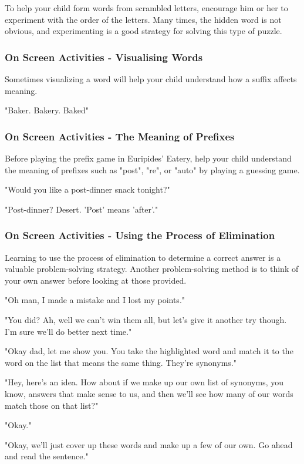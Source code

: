 To help your child form words from scrambled letters, encourage him or her to experiment with the order of the letters.
Many times, the hidden word is not obvious, and experimenting is a good strategy for solving this type of puzzle.

\subsubsection{On Screen Activities - Visualising Words}

Sometimes visualizing a word will help your child understand how a suffix affects meaning.

"Baker. Bakery. Baked"

\subsubsection{On Screen Activities - The Meaning of Prefixes}

Before playing the prefix game in Euripides' Eatery, help your child understand the meaning of prefixes such as "post", "re", or "auto" by playing a guessing game.

"Would you like a post-dinner snack tonight?"

"Post-dinner? Desert. 'Post' means 'after'."

\subsubsection{On Screen Activities - Using the Process of Elimination}

Learning to use the process of elimination to determine a correct answer is a valuable problem-solving strategy.
Another problem-solving method is to think of your own answer before looking at those provided.

"Oh man, I made a mistake and I lost my points."

"You did?
Ah, well we can't win them all, but let's give it another try though.
I'm sure we'll do better next time."

"Okay dad, let me show you.
You take the highlighted word and match it to the word on the list that means the same thing.
They're synonyms."

"Hey, here's an idea.
How about if we make up our own list of synonyms, you know, answers that make sense to us, and then we'll see how many of our words match those on that list?"

"Okay."

"Okay, we'll just cover up these words and make up a few of our own.
Go ahead and read the sentence."

